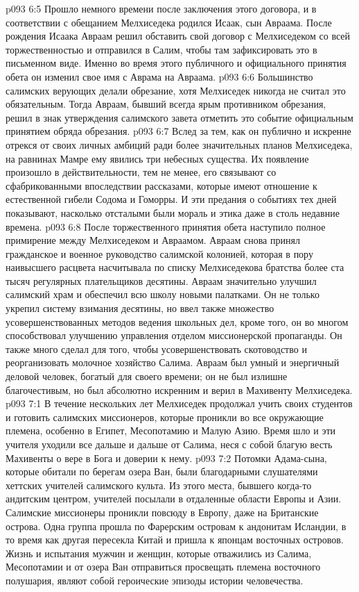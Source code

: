 \vs p093 6:5 Прошло немного времени после заключения этого договора, и в соответствии с обещанием Мелхиседека родился Исаак, сын Авраама. После рождения Исаака Авраам решил обставить свой договор с Мелхиседеком со всей торжественностью и отправился в Салим, чтобы там зафиксировать это в письменном виде. Именно во время этого публичного и официального принятия обета он изменил свое имя с Аврама на Авраама.
\vs p093 6:6 Большинство салимских верующих делали обрезание, хотя Мелхиседек никогда не считал это обязательным. Тогда Авраам, бывший всегда ярым противником обрезания, решил в знак утверждения салимского завета отметить это событие официальным принятием обряда обрезания.
\vs p093 6:7 Вслед за тем, как он публично и искренне отрекся от своих личных амбиций ради более значительных планов Мелхиседека, на равнинах Мамре ему явились три небесных существа. Их появление произошло в действительности, тем не менее, его связывают со сфабрикованными впоследствии рассказами, которые имеют отношение к естественной гибели Содома и Гоморры. И эти предания о событиях тех дней показывают, насколько отсталыми были мораль и этика даже в столь недавние времена.
\vs p093 6:8 После торжественного принятия обета наступило полное примирение между Мелхиседеком и Авраамом. Авраам снова принял гражданское и военное руководство салимской колонией, которая в пору наивысшего расцвета насчитывала по списку Мелхиседекова братства более ста тысяч регулярных плательщиков десятины. Авраам значительно улучшил салимский храм и обеспечил всю школу новыми палатками. Он не только укрепил систему взимания десятины, но ввел также множество усовершенствованных методов ведения школьных дел, кроме того, он во многом способствовал улучшению управления отделом миссионерской пропаганды. Он также много сделал для того, чтобы усовершенствовать скотоводство и реорганизовать молочное хозяйство Салима. Авраам был умный и энергичный деловой человек, богатый для своего времени; он не был излишне благочестивым, но был абсолютно искренним и верил в Махивенту Мелхиседека.
\vs p093 7:1 В течение нескольких лет Мелхиседек продолжал учить своих студентов и готовить салимских миссионеров, которые проникли во все окружающие племена, особенно в Египет, Месопотамию и Малую Азию. Время шло и эти учителя уходили все дальше и дальше от Салима, неся с собой благую весть Махивенты о вере в Бога и доверии к нему.
\vs p093 7:2 Потомки Адама\hyp{}сына, которые обитали по берегам озера Ван, были благодарными слушателями хеттских учителей салимского культа. Из этого места, бывшего когда\hyp{}то андитским центром, учителей посылали в отдаленные области Европы и Азии. Салимские миссионеры проникли повсюду в Европу, даже на Британские острова. Одна группа прошла по Фарерским островам к андонитам Исландии, в то время как другая пересекла Китай и пришла к японцам восточных островов. Жизнь и испытания мужчин и женщин, которые отважились из Салима, Месопотамии и от озера Ван отправиться просвещать племена восточного полушария, являют собой героические эпизоды истории человечества.
